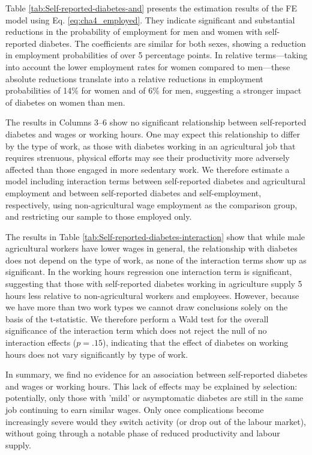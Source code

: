 Table \ref{tab:Self-reported-diabetes-and} presents the estimation results of the \ac{FE} model using Eq. \ref{eq:cha4_employed}. They indicate significant and substantial reductions in the probability of employment for men and women with self-reported diabetes. The coefficients are similar for both sexes, showing a reduction in employment probabilities of over 5 percentage points. In relative terms---taking into account the lower employment rates for women compared to men---these absolute reductions translate into a relative reductions in employment probabilities of 14\% for women and of 6\% for men, suggesting a stronger impact of diabetes on women than men.

The results in Columns 3--6 show no significant relationship between self-reported diabetes and wages or working hours. One may expect this relationship to differ by the type of work, as those  with diabetes working in an agricultural job that requires strenuous, physical efforts may see their productivity more adversely affected than those engaged in more sedentary work. We therefore estimate a model including interaction terms between self-reported diabetes and agricultural employment and between self-reported diabetes and self-employment, respectively, using non-agricultural wage employment as the comparison group, and restricting our sample to those employed only. 

The results in Table \ref{tab:Self-reported-diabetes-interaction} show that while male agricultural workers have lower wages in general, the relationship with diabetes does not depend on the type of work, as none of the interaction terms show up as significant. In the working hours regression one interaction term is significant, suggesting that those with self-reported diabetes working in agriculture supply 5 hours less relative to non-agricultural workers and employees. However, because we have more than two work types we cannot draw conclusions
solely on the basis of the t-statistic. We therefore perform a Wald test for the overall significance of the interaction term which does
not reject the null of no interaction effects ($p = .15$), indicating that the effect of diabetes on working hours does not vary significantly by type of work. 

In summary, we find no evidence for an association between self-reported diabetes and wages or working hours. This lack of effects may be explained by selection: potentially, only those with 'mild' or asymptomatic diabetes are still in the same job continuing to earn similar wages. Only once complications become increasingly severe would they switch activity (or drop out of the labour market), without going through a notable phase of reduced productivity and labour supply.

